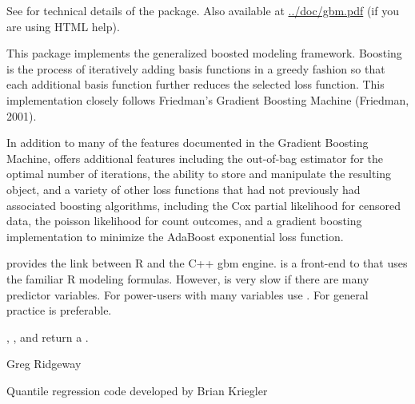 \documentclass{article}
\begin{document}
\begin{Details}\relax
See  for technical details of the package. Also available 
at \url{../doc/gbm.pdf} (if you are using HTML help).

This package implements the generalized boosted modeling framework.
Boosting is the process of iteratively adding basis functions in a greedy
fashion so that each additional basis function further reduces the selected
loss function. This implementation closely follows Friedman's Gradient
Boosting Machine (Friedman, 2001).

In addition to many of the features documented in the Gradient Boosting Machine,
 offers additional features including the out-of-bag estimator for
the optimal number of iterations, the ability to store and manipulate the
resulting  object, and a variety of other loss functions that had not
previously had associated boosting algorithms, including the Cox partial
likelihood for censored data, the poisson likelihood for count outcomes, and a
gradient boosting implementation to minimize the AdaBoost exponential loss
function.

 provides the link between R and the C++ gbm engine. 
is a front-end to  that uses the familiar R modeling formulas.
However,  is very slow if there are many
predictor variables. For power-users with many variables use .
For general practice  is preferable.
\end{Details}
\begin{Value}
, , and  return a
.
\end{Value}
\begin{Author}\relax
Greg Ridgeway 

Quantile regression code developed by Brian Kriegler 
\end{Author}
\end{document}
